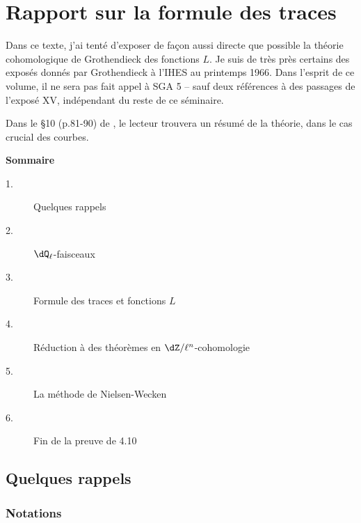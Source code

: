 

\chapter{Rapport sur la formule des traces}\label{II}

Dans ce texte, j'ai tenté d'exposer de façon aussi directe que possible la 
théorie cohomologique de Grothendieck des fonctions $L$. Je suis de très près 
certains des exposés donnés par Grothendieck à l'IHES au printemps 1966. Dans 
l'esprit de ce volume, il ne sera pas fait appel à SGA 5 -- sauf deux 
références à des passages de l'exposé XV, indépendant du reste de ce 
séminaire. 

Dans le \S 10 (p.81-90) de , le lecteur trouvera un résumé de la 
théorie, dans le cas crucial des courbes. 










\begin{center}\textbf{Sommaire}\end{center}
\begin{description}
\item[1.] Quelques rappels 
\item[2.] $\dQ_\ell$-faisceaux 
\item[3.] Formule des traces et fonctions $L$ 
\item[4.] Réduction à des théorèmes en $\dZ/\ell^n$-cohomologie 
\item[5.] La méthode de Nielsen-Wecken 
\item[6.] Fin de la preuve de 4.10 
\end{description}

\section{Quelques rappels}\label{II:1}





\subsection{Notations}\label{II:1-1}

